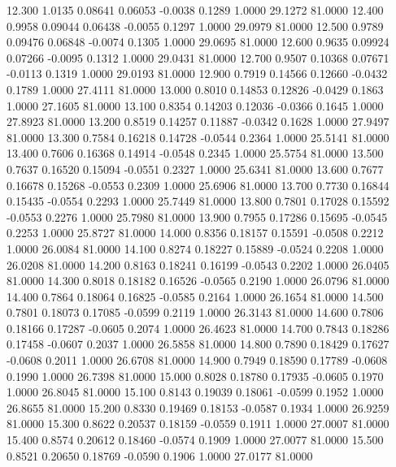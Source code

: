   12.300   1.0135   0.08641   0.06053  -0.0038   0.1289   1.0000  29.1272  81.0000
  12.400   0.9958   0.09044   0.06438  -0.0055   0.1297   1.0000  29.0979  81.0000
  12.500   0.9789   0.09476   0.06848  -0.0074   0.1305   1.0000  29.0695  81.0000
  12.600   0.9635   0.09924   0.07266  -0.0095   0.1312   1.0000  29.0431  81.0000
  12.700   0.9507   0.10368   0.07671  -0.0113   0.1319   1.0000  29.0193  81.0000
  12.900   0.7919   0.14566   0.12660  -0.0432   0.1789   1.0000  27.4111  81.0000
  13.000   0.8010   0.14853   0.12826  -0.0429   0.1863   1.0000  27.1605  81.0000
  13.100   0.8354   0.14203   0.12036  -0.0366   0.1645   1.0000  27.8923  81.0000
  13.200   0.8519   0.14257   0.11887  -0.0342   0.1628   1.0000  27.9497  81.0000
  13.300   0.7584   0.16218   0.14728  -0.0544   0.2364   1.0000  25.5141  81.0000
  13.400   0.7606   0.16368   0.14914  -0.0548   0.2345   1.0000  25.5754  81.0000
  13.500   0.7637   0.16520   0.15094  -0.0551   0.2327   1.0000  25.6341  81.0000
  13.600   0.7677   0.16678   0.15268  -0.0553   0.2309   1.0000  25.6906  81.0000
  13.700   0.7730   0.16844   0.15435  -0.0554   0.2293   1.0000  25.7449  81.0000
  13.800   0.7801   0.17028   0.15592  -0.0553   0.2276   1.0000  25.7980  81.0000
  13.900   0.7955   0.17286   0.15695  -0.0545   0.2253   1.0000  25.8727  81.0000
  14.000   0.8356   0.18157   0.15591  -0.0508   0.2212   1.0000  26.0084  81.0000
  14.100   0.8274   0.18227   0.15889  -0.0524   0.2208   1.0000  26.0208  81.0000
  14.200   0.8163   0.18241   0.16199  -0.0543   0.2202   1.0000  26.0405  81.0000
  14.300   0.8018   0.18182   0.16526  -0.0565   0.2190   1.0000  26.0796  81.0000
  14.400   0.7864   0.18064   0.16825  -0.0585   0.2164   1.0000  26.1654  81.0000
  14.500   0.7801   0.18073   0.17085  -0.0599   0.2119   1.0000  26.3143  81.0000
  14.600   0.7806   0.18166   0.17287  -0.0605   0.2074   1.0000  26.4623  81.0000
  14.700   0.7843   0.18286   0.17458  -0.0607   0.2037   1.0000  26.5858  81.0000
  14.800   0.7890   0.18429   0.17627  -0.0608   0.2011   1.0000  26.6708  81.0000
  14.900   0.7949   0.18590   0.17789  -0.0608   0.1990   1.0000  26.7398  81.0000
  15.000   0.8028   0.18780   0.17935  -0.0605   0.1970   1.0000  26.8045  81.0000
  15.100   0.8143   0.19039   0.18061  -0.0599   0.1952   1.0000  26.8655  81.0000
  15.200   0.8330   0.19469   0.18153  -0.0587   0.1934   1.0000  26.9259  81.0000
  15.300   0.8622   0.20537   0.18159  -0.0559   0.1911   1.0000  27.0007  81.0000
  15.400   0.8574   0.20612   0.18460  -0.0574   0.1909   1.0000  27.0077  81.0000
  15.500   0.8521   0.20650   0.18769  -0.0590   0.1906   1.0000  27.0177  81.0000
